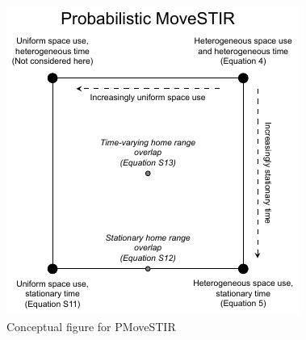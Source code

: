 \documentclass[letterpaper]{article}
\begin{document}



\begin{figure}
    \includegraphics[width=\textwidth]{figures/conceptual_figure_pmovestir.pdf}
    \caption{Conceptual figure for PMoveSTIR}
\end{figure}
\end{document}

